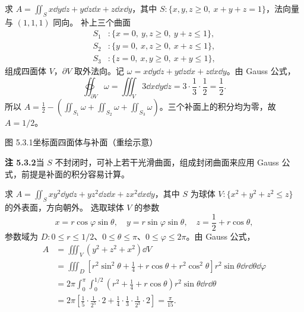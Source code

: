 求 $A=\iint_Sx\dd y\dd z+y\dd z\dd x+z\dd x\dd y$，其中
$S:\{x,y,z\ge0,\ x+y+z=1\}$，法向量与 $(1,1,1)$ 同向。
\sol 补上三个曲面
\[
\begin{aligned}
S_1&:\{x=0,\ y,z\ge0,\ y+z\le1\},\\
S_2&:\{y=0,\ x,z\ge0,\ x+z\le1\},\\
S_3&:\{z=0,\ x,y\ge0,\ x+y\le1\},
\end{aligned}
\]
组成四面体 $V$，$\partial V$ 取外法向。记 $\omega=x\dd y\dd z+y\dd z\dd x+z\dd x\dd y$。由 Gauss 公式，
\[
\oiint_{\partial V}\omega=\iiint_V3\dd x\dd y\dd z=3\cdot\frac13\cdot\frac12=\frac12.
\]
所以 $A=\frac12-(\iint_{S_1}\omega+\iint_{S_2}\omega+\iint_{S_3}\omega)$。三个补面上的积分均为零，故 $A=1/2$。
\begin{center}\begin{minipage}{\linewidth}\centering
{}\par{\small 图 5.3.1\quad 坐标面四面体与补面（重绘示意）}
\end{minipage}\end{center}
\textbf{注 5.3.2}\quad 当 $S$ 不封闭时，可补上若干光滑曲面，组成封闭曲面来应用 Gauss 公式，前提是补面的积分容易计算。

求 $A=\iint_Sxy^2\dd y\dd z+yz^2\dd z\dd x+zx^2\dd x\dd y$，其中 $S$ 为球体 $V:\{x^2+y^2+z^2\le z\}$ 的外表面，方向朝外。
\sol 选取球体 $V$ 的参数
\[
x=r\cos\varphi\sin\theta,\quad y=r\sin\varphi\sin\theta,\quad z=\frac12+r\cos\theta,
\]
参数域为 $D:0\le r\le1/2$、$0\le\theta\le\pi$、$0\le\varphi\le2\pi$。由 Gauss 公式，
\begin{align*}
A&=\iiint_V(y^2+z^2+x^2)\dd V\\
&=\iiint_D\left[r^2\sin^2\theta+\frac14+r\cos\theta+r^2\cos^2\theta\right]r^2\sin\theta\dd r\dd\theta\dd\varphi\\
&=2\pi\int_0^\pi\int_0^{1/2}\left(r^2+\frac14+r\cos\theta\right)r^2\sin\theta\dd r\dd\theta\\
&=2\pi\left[\frac15\cdot\frac1{2^5}\cdot2+\frac14\cdot\frac13\cdot\frac1{2^3}\cdot2\right]=\frac\pi{15}.
\end{align*}

